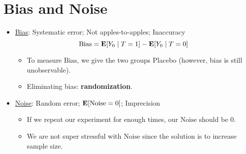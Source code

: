 \documentclass[10pt, letterpaper]{article}
\def\E{\vb{E}}
\def\Bias{\mathrm{Bias}}
\begin{document}
\section{Bias and Noise}
\begin{itemize}
	\item \underline{Bias}: Systematic error; Not apples-to-apples; Inaccuracy \[\Bias=\E[Y_0\mid T=1]-\E[Y_0\mid T=0]\]
	\begin{itemize}
		\item To measure $\Bias$, we give the two groups Placebo (however, bias is still unobservable). 
		\item Eliminating bias: \textbf{randomization}.
	\end{itemize}
	\item \underline{Noise}: Random error; $\E\qty[\mathrm{Noise}=0]$; Imprecision
	\begin{itemize}
		\item If we repeat our experiment for enough times, our $\mathrm{Noise}$ should be $0$.
		\item We are not super stressful with $\mathrm{Noise}$ since the solution is to increase sample size. 
	\end{itemize}
\end{itemize}
\end{document}

